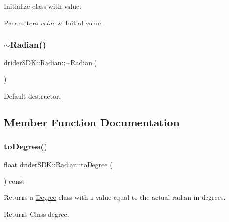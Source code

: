 Initialize class with value.


\begin{DoxyParams}{Parameters}
{\em value} & Initial value. \\
\hline
\end{DoxyParams}
\mbox{\label{classdrider_s_d_k_1_1_radian_a9b1711276eed04187623b4cb047c90ce}} 
\subsubsection{\texorpdfstring{$\sim$\+Radian()}{~Radian()}}
{\footnotesize\ttfamily drider\+S\+D\+K\+::\+Radian\+::$\sim$\+Radian (\begin{DoxyParamCaption}{ }\end{DoxyParamCaption})}

Default destructor. 

\subsection{Member Function Documentation}
\mbox{\label{classdrider_s_d_k_1_1_radian_a2b848dd9f60fbdb8e113620e9933f3d8}} 
\subsubsection{\texorpdfstring{to\+Degree()}{toDegree()}}
{\footnotesize\ttfamily float drider\+S\+D\+K\+::\+Radian\+::to\+Degree (\begin{DoxyParamCaption}{ }\end{DoxyParamCaption}) const}

Returns a \hyperlink{classdrider_s_d_k_1_1_degree}{Degree} class with a value equal to the actual radian in degrees.

\begin{DoxyReturn}{Returns}
Class degree. 
\end{DoxyReturn}
\mbox{\label{classdrider_s_d_k_1_1_radian_a6a7ebb658100e78676dee6ff095122d9}} 

